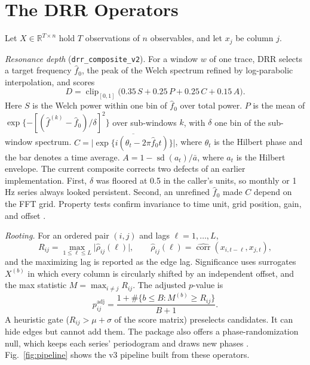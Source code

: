 \documentclass[10pt,twocolumn,letterpaper]{article}
\theoremstyle{definition}
\theoremstyle{remark}
\newcommand{\corr}{\operatorname{corr}}
\newcommand{\sd}{\operatorname{sd}}
\newcommand{\code}[1]{\texttt{#1}}
\newcommand{\padj}{p^{\mathrm{adj}}}
\begin{document}
\section{The DRR Operators}

Let $X\in\mathbb{R}^{T\times n}$ hold $T$ observations of $n$ observables, and
let $x_j$ be column $j$.

\textit{Resonance depth} (\code{drr\_composite\_v2}). For a window $w$ of one
trace, DRR selects a target frequency $\hat f_0$, the peak of the Welch spectrum
\cite{welch} refined by log-parabolic interpolation, and scores
\begin{equation}\label{eq:depth}
D=\operatorname{clip}_{[0,1]}\bigl(0.35\,S+0.25\,P+0.25\,C+0.15\,A\bigr).
\end{equation}
Here $S$ is the Welch power within one bin of $\hat f_0$ over total power. $P$
is the mean of $\exp\{-[(\hat f^{(k)}-\hat f_0)/\delta]^2\}$ over sub-windows
$k$, with $\delta$ one bin of the sub-window spectrum. $C=\bigl|\overline{\exp\{i(\theta_t-2\pi \hat f_0 t)\}}\bigr|$,
where $\theta_t$ is the Hilbert phase \cite{gabor} and the bar denotes a time
average. $A=1-\sd(a_t)/\bar a$, where $a_t$ is the Hilbert envelope. The
current composite corrects two defects of an earlier implementation. First,
$\delta$ was floored at 0.5 in the caller's units, so monthly or 1\,Hz series
always looked persistent. Second, an unrefined $\hat f_0$ made $C$ depend on the
FFT grid. Property tests confirm invariance to time unit, grid position, gain,
and offset \cite{drr}.

\textit{Rooting.} For an ordered pair $(i,j)$ and lags $\ell=1,\dots,L$,
\begin{equation}\label{eq:root}
R_{ij}=\max_{1\le \ell\le L}\bigl|\hat\rho_{ij}(\ell)\bigr|,\qquad
\hat\rho_{ij}(\ell)=\widehat{\corr}(x_{i,t-\ell},x_{j,t}),
\end{equation}
and the maximizing lag is reported as the edge lag. Significance uses
surrogates $X^{(b)}$ in which every column is circularly shifted by an
independent offset, and the max statistic $M=\max_{i\ne j}R_{ij}$. The adjusted
$p$-value is
\begin{equation}\label{eq:padj}
\padj_{ij}=\frac{1+\#\{b\le B: M^{(b)}\ge R_{ij}\}}{B+1}.
\end{equation}
A heuristic gate ($R_{ij}>\mu+\sigma$ of the score matrix) preselects
candidates. It can hide edges but cannot add them. The package also offers a
phase-randomization null, which keeps each series' periodogram and draws new
phases \cite{theiler}. Fig.~\ref{fig:pipeline} shows the v3 pipeline built from
these operators.
\end{document}
